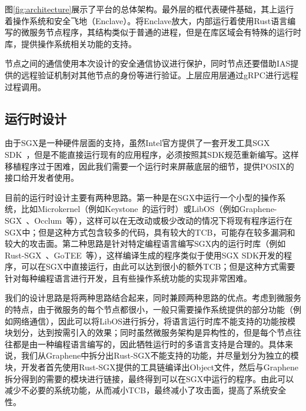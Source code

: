 图\ref{fig:architecture}展示了平台的总体架构。最外层的框代表硬件基础，其上运行着操作系统和安全飞地（Enclave）。将Enclave放大，内部运行着使用Rust语言编写的微服务节点程序，其结构类似于普通的进程，但是在库区域会有特殊的运行时库，提供操作系统相关功能的支持。

节点之间的通信使用本次设计的安全通信协议进行保护，同时节点还要借助IAS提供的远程验证机制对其他节点的身份等进行验证。上层应用层通过gRPC进行远程过程调用。

\subsection{运行时设计}

由于SGX是一种硬件层面的支持，虽然Intel官方提供了一套开发工具SGX SDK~\cite{costan2016intel}，但是不能直接运行现有的应用程序，必须按照其SDK规范重新编写。这样移植程序过于困难，因此我们需要一个运行时来屏蔽底层的细节，提供POSIX的接口给开发者使用。

目前的运行时设计主要有两种思路。第一种是在SGX中运行一个小型的操作系统，比如Microkernel（例如Keystone~\cite{lee2020keystone}的运行时）或LibOS（例如Graphene-SGX~\cite{tsai2017graphene}、Occlum~\cite{shen2020occlum}等），这样可以在无改动或极少改动的情况下将现有程序运行在SGX中；但是这种方式包含较多的代码，具有较大的TCB，可能存在较多漏洞和较大的攻击面。第二种思路是针对特定编程语言编写SGX内的运行时库（例如Rust-SGX~\cite{wang2019towards}、GoTEE~\cite{ghosn2019secured}等），这样编译生成的程序类似于使用SGX SDK开发的程序，可以在SGX中直接运行，由此可以达到很小的额外TCB；但是这种方式需要针对每种编程语言进行开发，且有些操作系统功能的实现非常困难。

我们的设计思路是将两种思路结合起来，同时兼顾两种思路的优点。考虑到微服务的特点，由于微服务的每个节点都很小，一般只需要操作系统提供的部分功能（例如网络通信），因此可以将LibOS进行拆分，将语言运行时库不能支持的功能按模块划分，达到按需引入的效果；同时虽然微服务架构是异构性的，但是每个节点往往都是由一种编程语言编写的，因此牺牲运行时的多语言支持是合理的。具体来说，我们从Graphene中拆分出Rust-SGX不能支持的功能，并尽量划分为独立的模块，开发者首先使用Rust-SGX提供的工具链编译出Object文件，然后与Graphene拆分得到的需要的模块进行链接，最终得到可以在SGX中运行的程序。由此可以减少不必要的系统功能，从而减小TCB，最终减小了攻击面，提高了系统安全性。

